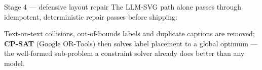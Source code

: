 \documentclass[aspectratio=169,11pt]{beamer}
\begin{document}
\begin{frame}{Stage 4 --- defensive layout repair}
  The LLM-SVG path alone passes through idempotent, deterministic repair
  passes before shipping:
  \vspace{1mm}
  \begin{center}
  \end{center}
  \vspace{1mm}
  \footnotesize
  Text-on-text collisions, out-of-bounds labels and duplicate captions are
  removed; \textbf{CP-SAT} (Google OR-Tools) then solves label placement to
  a global optimum --- the well-formed sub-problem a constraint solver
  already does better than any model.
\end{frame}
\end{document}
